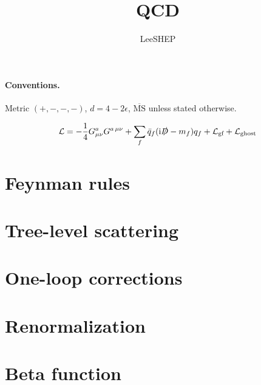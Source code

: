 \documentclass[11pt]{article}
\title{QCD}
\author{LeeSHEP}
\date{}
\begin{document}
\maketitle

\paragraph{Conventions.} Metric $(+,-,-,-)$, $d = 4 - 2\epsilon$, $\overline{\text{MS}}$ unless stated otherwise.

\begin{equation}
  \mathcal{L} = -\frac{1}{4}G^a_{\mu\nu}G^{a\,\mu\nu} + \sum_f \bar q_f(\mathrm{i}\slashed{D} - m_f)q_f + \mathcal{L}_{\text{gf}} + \mathcal{L}_{\text{ghost}}
\end{equation}

\section{Feynman rules}
\section{Tree-level scattering}
\section{One-loop corrections}
\section{Renormalization}
\section{Beta function}
\end{document}
